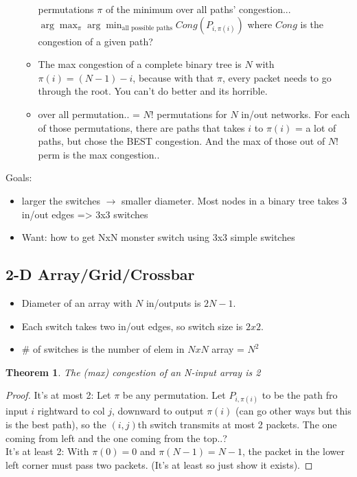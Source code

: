 \documentclass[10pt]{article}
\newcommand{\ra}{\rightarrow}
\newtheorem{theorem}{Theorem}[subsection]
\begin{document}
\begin{itemize}
\begin{itemize}
    permutations $\pi$ of the minimum over all paths' congestion...
    $\arg\max_{\pi}\arg\min_{\text{all possible paths}}Cong(P_{i, \pi(i)})$ where $Cong$ is the congestion of a given path?
  \item The max congestion
    of a complete binary tree is $N$ with $\pi(i) = (N-1)-i$, because
    with that $\pi$, every packet needs to go through the root. You can't do better and its
    horrible.
  \item over all permutation.. = $N!$ permutations for $N$ in/out
    networks. For each of those permutations, there are paths that
    takes $i$ to $\pi(i)$ = a lot of paths, but chose the BEST
    congestion. And the max of those out of $N!$ perm is the max congestion..
  \end{itemize}


\end{itemize}

Goals:
\begin{itemize} 
\item larger the switches $\ra$ smaller diameter. Most nodes in a binary
  tree takes 3 in/out edges => 3x3 switches
\item Want: how to get NxN monster switch using 3x3 simple switches
\end{itemize}

\subsection{2-D Array/Grid/Crossbar}
\label{sec:2-d-array}
\begin{itemize}
\item Diameter of an array with $N$ in/outputs is $2N-1$.
\item Each switch takes two in/out edges, so switch size is $2x2$.
\item \# of switches is the number of elem in $NxN$ array = $N^2$
\end{itemize}


\begin{theorem}
The (max) congestion of an N-input array is 2
\end{theorem}
 \begin{proof} 
It's at most 2: Let $\pi$ be any permutation. Let $P_{i, \pi(i)}$ to be the path fro
input $i$ rightward to col $j$, downward to output $\pi(i)$ (can go
other ways but this is the best path), so the $(i, j)$th switch transmits at most 2 packets. The one coming from
left and the one coming from the top..?\\
It's at least 2: With $\pi(0) = 0$ and $\pi(N-1) = N-1$, the packet in the lower left
corner must pass two packets. (It's at least so just show it exists).
  \end{proof}
\end{document}
